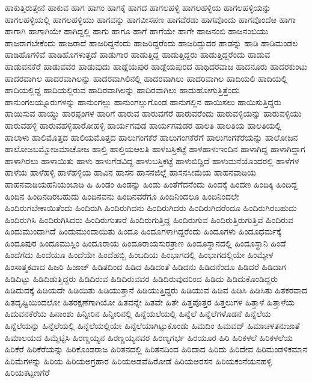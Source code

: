 {ಹಾಕುತ್ತಿರುತ್ತೇನೆ
ಹಾಕುವ
ಹಾಗ
ಹಾಗಂ
ಹಾಗಕ್ಕೆ
ಹಾಗದ
ಹಾಗಲಹಳ್ಳಿ
ಹಾಗಲಹಳ್ಳಿಯ
ಹಾಗಲಹಳ್ಳಿಯನ್ನು
ಹಾಗಲಹಳ್ಳಿಯಲ್ಲಿ
ಹಾಗಲಹಳ್ಳಿಯು
ಹಾಗವನ್ನು
ಹಾಗವೀಸಪಣ
ಹಾಗವೆರಡು
ಹಾಗವೊಂದು
ಹಾಗವೊಂದೆಱ
ಹಾಗಾ
ಹಾಗಾಗಿ
ಹಾಗಾಗಿಯೇ
ಹಾಗಿದ್ದಲ್ಲಿ
ಹಾಗು
ಹಾಗೂ
ಹಾಗೆ
ಹಾಗೆಯೇ
ಹಾಗೇ
ಹಾಜನಂಬಿ
ಹಾಜನಂಬಿಯು
ಹಾಜರಾಗಬೇಕೆಂದು
ಹಾಜರಾದೆ
ಹಾಜರಿದ್ದನೆಂದು
ಹಾಜರಿದ್ದರೆಂದು
ಹಾಜರಿದ್ದುದರ
ಹಾಡನ್ನು
ಹಾಡಿ
ಹಾಡಿಮಂಡಲ
ಹಾಡಿಹೊಗಳಿವೆ
ಹಾಡಿಹೊಗಳುತ್ತದೆ
ಹಾಡುಗಾರ
ಹಾಡುತ್ತಿದ್ದ
ಹಾಡುತ್ತಿದ್ದರು
ಹಾಡುತ್ತಿದ್ದರೆಂದು
ಹಾಡುವ
ಹಾಡುವನಕೆರೆ
ಹಾಡುವವರ
ಹಾಡುವುದು
ಹಾಡ್ಲೆಯಪುರ
ಹಾಡ್ಲೆಯಪುರದ
ಹಾಥಿದರವಾಜ
ಹಾದನೂರು
ಹಾದರಕುಂಟು
ಹಾದರವಾಗಿಲ
ಹಾದರವಾಗಿಲನ್ನು
ಹಾದರವಾಗಿಲಿನಲ್ಲಿ
ಹಾದರವಾಗಿಲು
ಹಾದರಿವಾಗಿಲ
ಹಾದಿಯಲಿ
ಹಾದಿಯಲ್ಲಿ
ಹಾದಿಯಲ್ಲಿದ್ದ
ಹಾದಿಯಲ್ಲಿರುವ
ಹಾದಿರವಾಗಿಲನ್ನು
ಹಾದಿರವಾಗಿಲು
ಹಾದುಹೋಗುತ್ತಿತ್ತೆಂದು
ಹಾನುಂಗಲಯ್ನೂರುಗಳನ್ನು
ಹಾನುಂಗಲ್ಲು
ಹಾನುಂಗಲ್ಲುಗೊಂಡ
ಹಾನುಗಲ್ಲಿನ
ಹಾಯಿಸಲು
ಹಾಯಿಸುತ್ತಿದ್ದರು
ಹಾಯಿಸುವ
ಹಾಯ್ದು
ಹಾರಪ್ಪಂಗಳ
ಹಾರಿಗೆ
ಹಾರುವ
ಹಾರುವಗೆರೆ
ಹಾರುವರೆಂದು
ಹಾರುವಳ್ಳಿಯನ್ನು
ಹಾರುವಳ್ಳಿಯು
ಹಾರುವಹಳ್ಳಿ
ಹಾರುವಹಳ್ಳಿಹಾರೋಹಳ್ಳಿ
ಹಾರ್ಯಗವುಡ
ಹಾರ್ಯಗವುಡರ
ಹಾಲತಿ
ಹಾಲತಿಯ
ಹಾಲತಿಯಲ್ಲಿ
ಹಾಲಾಳು
ಹಾಲಿಮೊತ್ತದ
ಹಾಲಿಯಮೊತ್ತದ
ಹಾಲುಗಂಗಕೆರೆ
ಹಾಲುಗಂಗಕೆರೆಗೆ
ಹಾಲುಗಂಗಕೆರೆಯನ್ನು
ಹಾಲೋಜನ
ಹಾಲೋಜಬಮ್ಮೋಜಮಾಚೋಜ
ಹಾಲ್ತಿ
ಹಾಲ್ತಿಯಆಲತಿ
ಹಾಳಬಸ್ತಿಕಟ್ಟೆ
ಹಾಳಹಾಳುಇಂದಿನ
ಹಾಳಾಗಿದ್ದ
ಹಾಳಾಗಿದ್ದಾಗ
ಹಾಳಾಗಿರಲು
ಹಾಳಾಯಿತು
ಹಾಳು
ಹಾಳುಗೆಡವಿದ್ದ
ಹಾಳುಬಸ್ತಿಕಟ್ಟೆ
ಹಾಳುಬಿದ್ದಿದೆ
ಹಾಳುಮನೆಯೊಂದರಲ್ಲಿ
ಹಾಳೆಗಳ
ಹಾಳೆಯ
ಹಾಳೆಹಳ್ಳಿ
ಹಾಳೆಹಳ್ಳಿಯ
ಹಾವಿನ
ಹಾಸನ
ಹಾಸನಜಿಲ್ಲೆ
ಹಾಸನಸೀಮೆಯ
ಹಾಹನವಾಡಿಯ
ಹಾಹನವಾಡಿಯಹನಿಯಂಬಾಡಿ
ಹಿ
ಹಿಂಡಂ
ಹಿಂಡನ್ನು
ಹಿಂಡು
ಹಿಂತೆಗೆದನೆಂದು
ಹಿಂದಕ್ಕೆ
ಹಿಂದಣ
ಹಿಂದಿಕ್ಕಿ
ಹಿಂದಿದ್ದ
ಹಿಂದಿನ
ಹಿಂದಿನದಿರಬಹುದು
ಹಿಂದಿನವನು
ಹಿಂದಿನವರೆಗೂ
ಹಿಂದಿನಿಂದಲೂ
ಹಿಂದಿನಿಂದಲೇ
ಹಿಂದಿರುಗಬೇಕಾಯಿತೆಂದು
ಹಿಂದಿರುಗಿ
ಹಿಂದಿರುಗಿದನು
ಹಿಂದಿರುಗಿದರು
ಹಿಂದಿರುಗಿದರೆಂದೂ
ಹಿಂದಿರುಗಿರಬಹುದು
ಹಿಂದಿರುಗಿಸಿ
ಹಿಂದಿರುಗಿಸಿದರು
ಹಿಂದಿರುಗುತಾರೆ
ಹಿಂದಿರುಗುತ್ತಿದ್ದ
ಹಿಂದಿರುಗುವ
ಹಿಂದಿರುತ್ತಿರುಗುತ್ತಿವೆ
ಹಿಂದಿರುವ
ಹಿಂದುಮುಂದಾಗಿದೆ
ಹಿಂದುಮುಂದಾಯಿತು
ಹಿಂದೂ
ಹಿಂದೂಗಳಾಗಿದ್ದರೆಂದು
ಹಿಂದೂಗಳು
ಹಿಂದೂಧರ್ಮಕ್ಕೆ
ಹಿಂದೂಪುರ
ಹಿಂದೂಮುಸ್ಲಿಂ
ಹಿಂದೂರಾಯ
ಹಿಂದೂರಾಯಸುರತ್ರಾಣ
ಹಿಂದೂಸ್ಥಾನದಲ್ಲಿ
ಹಿಂದೂಸ್ಥಾನಿ
ಹಿಂದೆ
ಹಿಂದೆಗೆದು
ಹಿಂದೆಯೂ
ಹಿಂದೆಯೇ
ಹಿಂದೆಹಬ್ಬಿ
ಹಿಂಬದಿಯ
ಹಿಂಭಾಗದಲ್ಲಿ
ಹಿಂಭಾಗದಲ್ಲಿಯೇ
ಹಿಂಮ್ಯೇಳ
ಹಿಂಸಾತ್ಮಕವಾದ
ಹಿಜರಿ
ಹಿಜಾಜ್
ಹಿಡಿತದಿಂದ
ಹಿಡಿದ
ಹಿಡಿದಂತೆ
ಹಿಡಿದನು
ಹಿಡಿದನೆಂದೂ
ಹಿಡಿದರೆ
ಹಿಡಿದಾಗ
ಹಿಡಿದಿಟ್ಟು
ಹಿಡಿದಿಡುತ್ತಿದ್ದರು
ಹಿಡಿದಿರುವ
ಹಿಡಿದಿರುವವರ
ಹಿಡಿದಿರುವುದರಿಂದ
ಹಿಡಿದು
ಹಿಡಿದುಕೊಂಡಿದ್ದರು
ಹಿಡಿದುದಕ್ಕೆ
ಹಿಡಿಯದೇ
ಹಿಡಿಯಿತು
ಹಿಡಿಯುತ್ತಾನೆ
ಹಿಡಿಯುತ್ತಿದ್ದರು
ಹಿಡಿಯುವ
ಹಿಡಿವ
ಹಿಡಿಸಿ
ಹಿಡಿಸಿತು
ಹಿತಕರವಾದ
ಹಿತದೃಷ್ಟಿಯಿಂದಲೋ
ಹಿತರಕ್ಷಣೆಗಾಗಿಯೋ
ಹಿತವನ್ನೇ
ಹಿತವೇ
ಹಿತೇ
ಹಿತ್ತಪೊತ್ತರ
ಹಿತ್ತಲುಗಳ
ಹಿತ್ತಾಳೆ
ಹಿತ್ತಾಳೆಯ
ಹಿದುವನಕೆರೆಯ
ಹಿನಾಂಶು
ಹಿನ್ನೀರಿನ
ಹಿನ್ನೀರಿನಲ್ಲಿ
ಹಿನ್ನೆಯಲೆಯಲ್ಲಿ
ಹಿನ್ನೆಲೆ
ಹಿನ್ನೆಲೆಗಳೊಡನೆ
ಹಿನ್ನೆಲೆಯ
ಹಿನ್ನೆಲೆಯನ್ನು
ಹಿನ್ನೆಲೆಯಲ್ಲಿ
ಹಿನ್ನೆಲೆಯಲ್ಲಿಯೇ
ಹಿನ್ನೆಲೆಯಾಗಿಟ್ಟುಕೊಂಡು
ಹಿಮದಿಂ
ಹಿಮವದ್
ಹಿಮಾಚಳತನುಜಾತೆ
ಹಿಮಾಲಯದ
ಹಿಮ್ಮೆಟ್ಟಿಸಿ
ಹಿರಣ್ಣಯ್ಯನ
ಹಿರಣ್ಣಯ್ಯನವರ
ಹಿರಣ್ಯಗರ್ಭ
ಹಿರಯೂರ
ಹಿರಿ
ಹಿರಿಕಳಲೆ
ಹಿರಿಕಳಲೆಯ
ಹಿರಿಕೆರೆ
ಹಿರಿಕೆರೆಯನ್ನು
ಹಿರಿಕೊಂಡರಾಜ
ಹಿರಿತನದಲ್ಲಿ
ಹಿರಿತನದಿಂದ
ಹಿರಿದಾದ
ಹಿರಿದು
ಹಿರಿದೇವ
ಹಿರಿಮಂಡಳಿಕಮಾನ
ಹಿರಿಮೆಗಳನ್ನು
ಹಿರಿಯ
ಹಿರಿಯಅಗ್ರಹಾರ
ಹಿರಿಯಅಡವೆಹಿರೋಡೆ
ಹಿರಿಯಅರಸನ
ಹಿರಿಯಕಂನೆಯನಹಳ್ಳಿ
ಹಿರಿಯಕಟ್ಟಣಗೆರೆ
}
